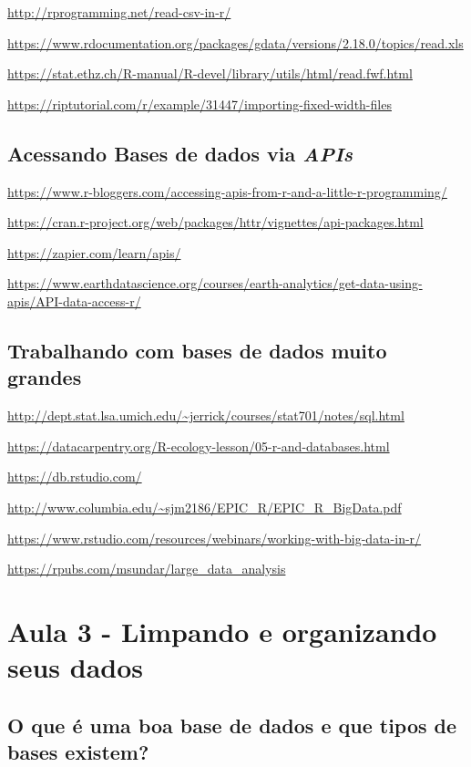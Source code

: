 \documentclass[12pt,a4paper,oneside]{erdc}
\begin{document}
\url{http://rprogramming.net/read-csv-in-r/}

\url{https://www.rdocumentation.org/packages/gdata/versions/2.18.0/topics/read.xls}

\url{https://stat.ethz.ch/R-manual/R-devel/library/utils/html/read.fwf.html}

\url{https://riptutorial.com/r/example/31447/importing-fixed-width-files}


\section{Acessando Bases de dados via \textit{APIs}}

\url{https://www.r-bloggers.com/accessing-apis-from-r-and-a-little-r-programming/}

\url{https://cran.r-project.org/web/packages/httr/vignettes/api-packages.html}

\url{https://zapier.com/learn/apis/}

\url{https://www.earthdatascience.org/courses/earth-analytics/get-data-using-apis/API-data-access-r/}



\section{Trabalhando com bases de dados muito grandes}

\url{http://dept.stat.lsa.umich.edu/~jerrick/courses/stat701/notes/sql.html}

\url{https://datacarpentry.org/R-ecology-lesson/05-r-and-databases.html}

\url{https://db.rstudio.com/}

\url{http://www.columbia.edu/~sjm2186/EPIC_R/EPIC_R_BigData.pdf}

\url{https://www.rstudio.com/resources/webinars/working-with-big-data-in-r/}

\url{https://rpubs.com/msundar/large_data_analysis}






%
%

\chapter{Aula 3 - Limpando e organizando seus dados}

	\section{O que é uma boa base de dados e que tipos de bases existem?}
	
\end{document}
